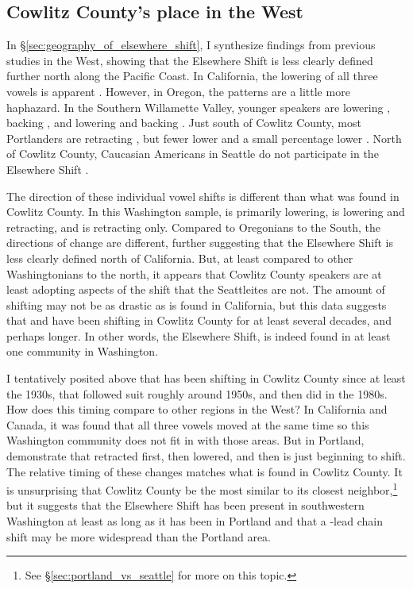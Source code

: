 \subsection{Cowlitz County's place in the West}
\label{sec:cowlitz_place_in_west_preobstruent}

In \S\ref{sec:geography_of_elsewhere_shift}, I synthesize findings from previous studies in the West, showing that the Elsewhere Shift is less clearly defined further north along the Pacific Coast. In California, the lowering of all three vowels is apparent \citep{janoff_2018, hall_lew_etal_2015, cardoso_etal_2016_pads, kennedy_grama_2012, holland_2014_diss}. However, in Oregon, the patterns are a little more haphazard. In the Southern Willamette Valley, younger speakers are lowering \bit, backing \bet, and lowering and backing \bat \citep{nelson_2011}. Just south of Cowlitz County, most Portlanders are retracting \bat \citep{conn_2000_diss, becker_etal_2013}, but fewer lower \bet and a small percentage lower \bit \citep{becker_etal_2016_pads}. North of Cowlitz County, Caucasian Americans in Seattle do not participate in the Elsewhere Shift \citep{wassink_2015, riebold_2015_diss}.

The direction of these individual vowel shifts is different than what was found in Cowlitz County. In this Washington sample, \bat is primarily lowering, \bet is lowering and retracting, and \bit is retracting only. Compared to Oregonians to the South, the directions of change are different, further suggesting that the Elsewhere Shift is less clearly defined north of California. But, at least compared to other Washingtonians to the north, it appears that Cowlitz County speakers are at least adopting aspects of the shift that the Seattleites are not. The amount of shifting may not be as drastic as is found in California, but this data suggests that \bat and \bet have been shifting in Cowlitz County for at least several decades, and perhaps longer. In other words, the Elsewhere Shift, is indeed found in at least one community in Washington.

I tentatively posited above that \bat has been shifting in Cowlitz County since at least the 1930s, that \bet followed suit roughly around 1950s, and then \bit did in the 1980s. How does this timing compare to other regions in the West? In California and Canada, it was found that all three vowels moved at the same time \citep{pratt_etal_2018, donofrio_etal_2019, lawrance_2002_thesis, boberg_2005} so this Washington community does not fit in with those areas. But in Portland, \citet{becker_etal_2016_pads} demonstrate that \bat retracted first, then \bet lowered, and then \bit is just beginning to shift. The relative timing of these changes matches what is found in Cowlitz County. It is unsurprising that Cowlitz County be the most similar to its closest neighbor,\footnote{See \S\ref{sec:portland_vs_seattle} for more on this topic.} but it suggests that the Elsewhere Shift has been present in southwestern Washington at least as long as it has been in Portland and that a \bat-lead chain shift may be more widespread than the Portland area.

